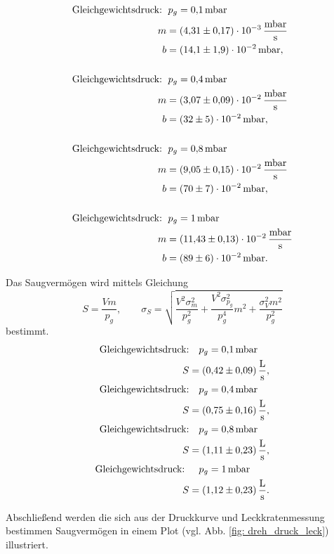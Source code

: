 \begin{align*}
  \text{Gleichgewichtsdruck: } &\, p_g=\SI{0.1}{\milli\bar} \\
  m&= \SI{4.31\pm 0.17 e-3 }{\milli\bar\per\second}\\
  b&=\SI{14.1\pm1.9 e-2}{\milli\bar},\\
  \\
  \text{Gleichgewichtsdruck: } &\, p_g=\SI{0.4}{\milli\bar} \\
  m&= \SI{3.07\pm 0.09 e-2 }{\milli\bar\per\second}\\
  b&=\SI{32\pm5 e-2}{\milli\bar},\\
  \\
  \text{Gleichgewichtsdruck: } &\, p_g=\SI{0.8}{\milli\bar}\\
  m&= \SI{9.05\pm 0.15 e-2 }{\milli\bar\per\second}\\
  b&=\SI{70\pm7 e-2}{\milli\bar},\\
  \\
  \text{Gleichgewichtsdruck: } &\, p_g=\SI{1}{\milli\bar}\\
  m&= \SI{11.43\pm 0.13 e-2 }{\milli\bar\per\second}\\
  b&=\SI{89\pm 6 e-2}{\milli\bar}.
\end{align*}

Das Saugvermögen wird mittels Gleichung
\begin{equation}
  \label{eq:saug_leck}
  S=\frac{Vm}{p_g}, \qquad \sigma_{S}=\sqrt{\frac{V^{2} \sigma_{m}^{2}}{p_{g}^{2}} + \frac{V^{2} \sigma_{p_{g}}^{2}}{p_{g}^{4}} m^{2} + \frac{\sigma_{V}^{2} m^{2}}{p_{g}^{2}}}
\end{equation}
bestimmt.
\begin{align*}
  \text{Gleichgewichtsdruck:} &\quad p_g=\SI{0.1}{\milli\bar} \\
  S&=\SI{0.42\pm 0.09}{\litre\per\second},
  \\
  \text{Gleichgewichtsdruck:} &\quad p_g=\SI{0.4}{\milli\bar} \\
  S&=\SI{0.75\pm 0.16}{\litre\per\second},
  \\
  \text{Gleichgewichtsdruck:} &\quad p_g=\SI{0.8}{\milli\bar}\\
  S&=\SI{1.11\pm 0.23}{\litre\per\second},
  \\
  \text{Gleichgewichtsdruck: } &\quad p_g=\SI{1}{\milli\bar}\\
  S&=\SI{1.12\pm 0.23}{\litre\per\second}.
\end{align*}

Abschließend werden die sich aus der Druckkurve und Leckkratenmessung bestimmen
Saugvermögen in einem Plot (vgl. Abb. \ref{fig: dreh_druck_leck}) illustriert.

